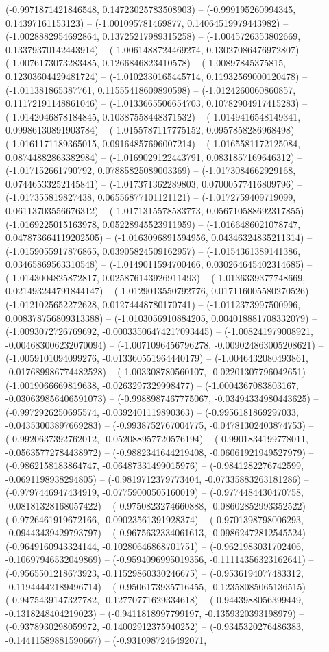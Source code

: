 (-0.9971871421846548, 0.14723025783508903) -- (-0.999195260994345, 0.14397161153123) -- (-1.001095781469877, 0.14064519979443982) -- (-1.0028882954692864, 0.13725217989315258) -- (-1.0045726353802669, 0.13379370142443914) -- (-1.0061488724469274, 0.13027086476972807) -- (-1.0076173073283485, 0.1266846823410578) -- (-1.00897845375815, 0.12303604429481724) -- (-1.0102330165445714, 0.11932569000120478) -- (-1.011381865387761, 0.11555418609890598) -- (-1.0124260060860857, 0.11172191148861046) -- (-1.0133665506654703, 0.10782904917415283) -- (-1.0142046878184845, 0.10387558448371532) -- (-1.0149416548149341, 0.09986130891903784) -- (-1.0155787117775152, 0.0957858286968498) -- (-1.0161171189365015, 0.09164857696007214) -- (-1.0165581172125084, 0.08744882863382984) -- (-1.0169029122443791, 0.0831857169646312) -- (-1.017152661790792, 0.07885825089003369) -- (-1.0173084662929168, 0.07446533252145841) -- (-1.017371362289803, 0.07000577416809796) -- (-1.017355819827438, 0.06556877101121121) -- (-1.0172759409719099, 0.06113703556676312) -- (-1.0171315578583773, 0.056710588692317855) -- (-1.0169225015163978, 0.05228945523911959) -- (-1.0166486021078747, 0.047873664119202505) -- (-1.0163096891594956, 0.04346324835211314) -- (-1.0159055917876865, 0.03905824509162957) -- (-1.0154361389141386, 0.03465869563310548) -- (-1.0149011594700466, 0.030264645402314685) -- (-1.0143004825872817, 0.025876143926911493) -- (-1.0136339377748669, 0.021493244791844147) -- (-1.0129013550792776, 0.017116005580270526) -- (-1.0121025652272628, 0.01274448780170741) -- (-1.0112373997500996, 0.008378756809313388) -- (-1.0103056910884205, 0.004018881708332079) -- (-1.0093072726769692, -0.00033506474217093445) -- (-1.008241979008921, -0.004683006232070094) -- (-1.0071096456796278, -0.009024863005208621) -- (-1.0059101094099276, -0.013360551964440179) -- (-1.0046432080493861, -0.017689986774482528) -- (-1.003308780560107, -0.02201307796042651) -- (-1.0019066669819638, -0.0263297329998477) -- (-1.0004367083803167, -0.030639856406591073) -- (-0.9988987467775067, -0.03494334980443625) -- (-0.9972926250695574, -0.0392401119890363) -- (-0.9956181869297033, -0.04353003897669283) -- (-0.9938752767004775, -0.04781302403874753) -- (-0.9920637392762012, -0.052088957720576194) -- (-0.9901834199778011, -0.05635772784438972) -- (-0.9882341644219408, -0.06061921949527979) -- (-0.9862158183864747, -0.06487331499015976) -- (-0.9841282276742599, -0.0691198938294805) -- (-0.9819712379773404, -0.07335883263181286) -- (-0.9797446947434919, -0.07759000505160019) -- (-0.9774484430470758, -0.08181328168057422) -- (-0.9750823274660888, -0.08602852993352522) -- (-0.9726461919672166, -0.09023561391928374) -- (-0.9701398798006293, -0.09443439429793797) -- (-0.9675632334061613, -0.09862472812545524) -- (-0.9649160943324144, -0.10280646868701751) -- (-0.9621983031702406, -0.10697946532049869) -- (-0.9594096995019356, -0.11114356323162641) -- (-0.9565501218673923, -0.11529860330246675) -- (-0.9536194077483312, -0.11944442189496714) -- (-0.9506173935716455, -0.12358085065136515) -- (-0.9475439147327782, -0.12770771629334618) -- (-0.9443988056399449, -0.1318248404219023) -- (-0.9411818997799197, -0.1359320393198979) -- (-0.9378930298059972, -0.14002912375940252) -- (-0.9345320276486383, -0.14411589881590667) -- (-0.9310987246492071, 